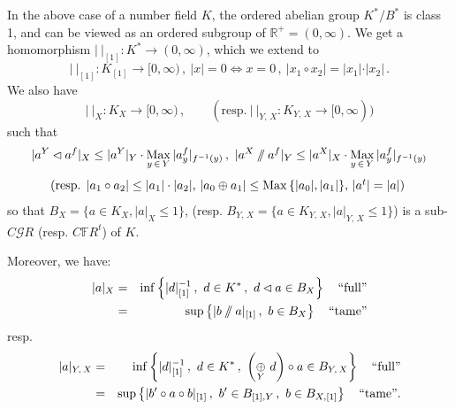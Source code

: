 \documentclass[leqno]{article}
\numberwithin{equation}{section}
\begin{document}
In the above case of a number field $K$, the ordered abelian group $K^* / B^*$ is class 1, and can be viewed as an ordered subgroup of ${\mathbb R}^+ = (0,\infty)$. We get a homomorphism $\vert \ \vert_{[1]} : K^* \to (0,\infty)$, which we extend to
\setcounter{equation}{4}
\begin{equation}
\label{eq55}
\vert \ \vert_{[1]} : K_{[1]} \to [0,\infty) \, , \ \vert x \vert = 0 \Leftrightarrow x = 0 \, , \ \vert x_1 \circ x_2 \vert = \vert x_1 \vert \cdot \vert x_2 \vert \, .
\end{equation}
We also have 
\begin{equation}
\label{eq56}
\vert \ \vert_X : K_X \to [0,\infty) \, , \qquad (\mbox{resp.} \ \vert \ \vert_{Y, \, X} : K_{Y , \, X} \to [0,\infty))
\end{equation}
such that
$$
\vert a^Y \lhd a^f \vert_X \leq \vert a^Y \vert_Y \cdot \underset{y \, \in \, Y}{\rm Max} \, \vert a_y^f \vert_{f^{-1} (y)} \, , \  \vert a^X \sslash a^f \vert_Y \leq \vert a^X \vert_X \cdot \underset{y \, \in \, Y}{\rm Max} \, \vert a_y^f \vert_{f^{-1} (y)}
$$
$$
\mbox{(resp. $\vert a_1 \circ a_2 \vert \leq \vert a_1 \vert \cdot \vert a_2 \vert$, $\vert a_0 \oplus a_1 \vert \leq {\rm Max} \left\{ \vert a_0 \vert , \vert a_1 \vert \right\}$, $\vert a^t \vert = \vert a \vert$) }
$$
so that $B_X = \{ a \in K_X , \vert a \vert_X \leq 1 \}$, (resp. $B_{Y, \, X} = \{ a \in K_{Y, \, X} , \vert a \vert_{Y , \, X} \leq 1 \}$) is a sub-$C{\mathcal G} R$ (resp. $C{\mathbb F} R^t$) of $K$. 

\smallskip

Moreover, we have:
\begin{eqnarray}
\label{eq57}
\vert a \vert_X &= &{\rm inf} \left\{ \vert d \vert_{[1]}^{-1} \, , \ d \in K^* \, , \ d \lhd a \in B_X \right\} \quad \mbox{``full''} \\
&= &\sup \left\{ \vert b \sslash a \vert_{[1]} \, , \ b \in B_X \right\} \quad \mbox{``tame''} \nonumber
\end{eqnarray}
resp.
\begin{eqnarray}
\vert a \vert_{Y, \, X} &= &{\rm inf} \left\{ \vert d \vert_{[1]}^{-1} \, , \ d \in K^* \, , \ \left(\underset{Y}{\oplus} \ d \right) \circ a \in B_{Y, \, X} \right\} \quad \mbox{``full''} \nonumber \\
&= &\sup \left\{ \vert b' \circ a \circ b \vert_{[1]} \, , \ b' \in B_{[1],Y} \, , \ b \in B_{X,[1]} \right\} \quad \mbox{``tame''}.\nonumber
\end{eqnarray}

\bigskip
\end{document}
